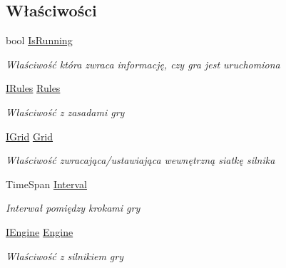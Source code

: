\subsection*{Właściwości}
\begin{DoxyCompactItemize}
\item 
bool \hyperlink{class_convay_1_1_core_1_1_game_ac770d7f2afda52d82efcc0882463de6d}{Is\+Running}
\begin{DoxyCompactList}\small\item\em Właściwość która zwraca informację, czy gra jest uruchomiona \end{DoxyCompactList}\item 
\hyperlink{interface_convay_1_1_core_1_1_interfaces_1_1_i_rules}{I\+Rules} \hyperlink{class_convay_1_1_core_1_1_game_a414e7d9f72590cd7523edecc50df15da}{Rules}
\begin{DoxyCompactList}\small\item\em Właściwość z zasadami gry \end{DoxyCompactList}\item 
\hyperlink{interface_convay_1_1_core_1_1_interfaces_1_1_i_grid}{I\+Grid} \hyperlink{class_convay_1_1_core_1_1_game_a079870860cd4f61916e99b839750e520}{Grid}
\begin{DoxyCompactList}\small\item\em Właściwość zwracająca/ustawiająca wewnętrzną siatkę silnika \end{DoxyCompactList}\item 
Time\+Span \hyperlink{class_convay_1_1_core_1_1_game_aafac64f23595335c918fa666223482c8}{Interval}
\begin{DoxyCompactList}\small\item\em Interwał pomiędzy krokami gry \end{DoxyCompactList}\item 
\hyperlink{interface_convay_1_1_core_1_1_interfaces_1_1_i_engine}{I\+Engine} \hyperlink{class_convay_1_1_core_1_1_game_a93fe3cfaff73c2e0378d78c3701ead38}{Engine}
\begin{DoxyCompactList}\small\item\em Właściwość z silnikiem gry \end{DoxyCompactList}\end{DoxyCompactItemize}

